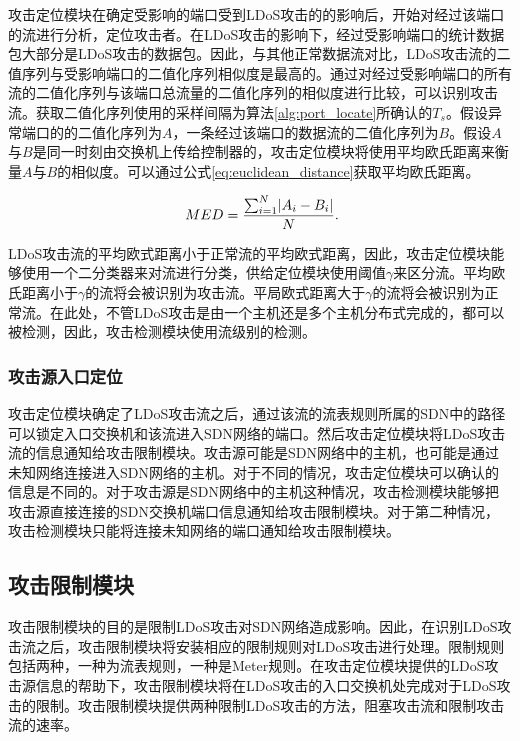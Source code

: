 攻击定位模块在确定受影响的端口受到LDoS攻击的的影响后，开始对经过该端口的流进行分析，定位攻击者。在LDoS攻击的影响下，经过受影响端口的统计数据包大部分是LDoS攻击的数据包。因此，与其他正常数据流对比，LDoS攻击流的二值序列与受影响端口的二值化序列相似度是最高的。通过对经过受影响端口的所有流的二值化序列与该端口总流量的二值化序列的相似度进行比较，可以识别攻击流。获取二值化序列使用的采样间隔为算法\ref{alg:port_locate}所确认的$T_s$。假设异常端口的的二值化序列为$A$，一条经过该端口的数据流的二值化序列为$B$。假设$A$与$B$是同一时刻由交换机上传给控制器的，攻击定位模块将使用平均欧氏距离来衡量$A$与$B$的相似度。可以通过公式\ref{eq:euclidean_distance}获取平均欧氏距离。

\begin{equation}
	\vspace{-0.1in}
	\label{eq:euclidean_distance}
	\ MED=\frac{\sum_{i=1}^{N}\lvert A_{i} - B_{i}\rvert}{N}.
\end{equation}

LDoS攻击流的平均欧式距离小于正常流的平均欧式距离，因此，攻击定位模块能够使用一个二分类器来对流进行分类，供给定位模块使用阈值$\gamma$来区分流。平均欧氏距离小于$\gamma$的流将会被识别为攻击流。平局欧式距离大于$\gamma$的流将会被识别为正常流。在此处，不管LDoS攻击是由一个主机还是多个主机分布式完成的，都可以被检测，因此，攻击检测模块使用流级别的检测。


\subsubsection{攻击源入口定位}
\label{chap4:ingressportlocation}

攻击定位模块确定了LDoS攻击流之后，通过该流的流表规则所属的SDN中的路径可以锁定入口交换机和该流进入SDN网络的端口。然后攻击定位模块将LDoS攻击流的信息通知给攻击限制模块。攻击源可能是SDN网络中的主机，也可能是通过未知网络连接进入SDN网络的主机。对于不同的情况，攻击定位模块可以确认的信息是不同的。对于攻击源是SDN网络中的主机这种情况，攻击检测模块能够把攻击源直接连接的SDN交换机端口信息通知给攻击限制模块。对于第二种情况，攻击检测模块只能将连接未知网络的端口通知给攻击限制模块。

\subsection{攻击限制模块}
\label{chap4:Mitigator}

攻击限制模块的目的是限制LDoS攻击对SDN网络造成影响。因此，在识别LDoS攻击流之后，攻击限制模块将安装相应的限制规则对LDoS攻击进行处理。限制规则包括两种，一种为流表规则，一种是Meter规则。在攻击定位模块提供的LDoS攻击源信息的帮助下，攻击限制模块将在LDoS攻击的入口交换机处完成对于LDoS攻击的限制。攻击限制模块提供两种限制LDoS攻击的方法，阻塞攻击流和限制攻击流的速率。


